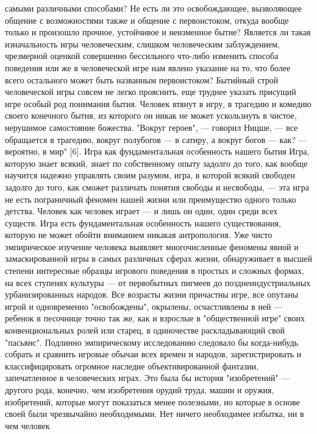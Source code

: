 \documentclass[12pt]{article}
\begin{document}
самыми различными способами? Не есть ли это освобождающее, вызволяющее общение с возможностями
также и общение с первоистоком, откуда вообще только и произошло прочное, устойчивое и неизменное бытие?
Является  ли  такая  изначальность  игры  человеческим,  слишком  человеческим  заблуждением,  чрезмерной
оценкой совершенно бессильного что-либо изменить способа поведения или же в человеческой игре нам явлено
указание  на  то,  что  более  всего  остального  может  быть  названным  первоистоком?  Бытийный  строй
человеческой игры совсем не легко прояснить, еще труднее указать присущий игре особый род понимания
бытия. Человек втянут в игру, в трагедию и комедию своего конечного бытия, из которого он никак не может
ускользнуть в чистое, нерушимое самостояние божества. "Вокруг героев", --- говорил Ницше, --- все обращается
в трагедию, вокруг полубогов --- в сатиру, а вокруг богов --- как? --- вероятно, в мир" [6].
Игра как фундаментальная особенность нашего бытия
Игра, которую знает всякий, знает по собственному опыту задолго до того, как вообще научится надежно
управлять своим разумом, игра, в которой всякий свободен задолго до того, как сможет различать понятия
свободы и несвободы, --- эта игра не есть пограничный феномен нашей жизни или преимущество одного только
детства. Человек как человек играет --- и лишь он один, один среди всех существ. Игра есть фундаментальная
особенность нашего существования, которую не может обойти вниманием никакая антропология. Уже чисто
эмпирическое изучение человека выявляет многочисленные феномены явной и замаскированной игры в самых 
различных сферах жизни, обнаруживает в высшей степени интересные образцы игрового поведения в простых
и  сложных  формах,  на  всех  ступенях  культуры  ---  от  первобытных  пигмеев  до  позднеиндустриальных
урбанизированных  народов.  Все  возрасты  жизни  причастны  игре,  все  опутаны  игрой  и  одновременно
"освобождены",  окрылены,  осчастливлены  в  ней  ---  ребенок  в  песочнице  точно  так  же,  как  и  взрослые  в
"общественной  игре"  своих  конвенциональных  ролей  или  старец,  в  одиночестве  раскладывающий  свой
"пасьянс". Подлинно эмпирическому исследованию следовало бы когда-нибудь собрать и сравнить игровые
обычаи всех времен и народов, зарегистрировать и классифицировать огромное наследие объективированной
фантазии, запечатленное в человеческих играх. Это была бы история "изобретений" --- другого рода, конечно,
чем изобретения орудий труда, машин и оружия, изобретений, которые могут показаться менее полезными, но
которые в основе своей были чрезвычайно необходимыми. Нет ничего необходимее избытка, ни в чем человек
\end{document}
